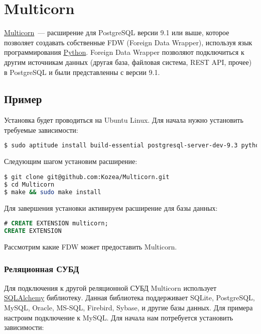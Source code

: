 \section{Multicorn}

\href{http://multicorn.org/}{Multicorn}~--- расширение для PostgreSQL версии 9.1 или выше, которое позволяет создавать собственные FDW (Foreign Data Wrapper), используя язык программирования \href{https://www.python.org/}{Python}. Foreign Data Wrapper позволяют подключиться к другим источникам данных (другая база, файловая система, REST API, прочее) в PostgreSQL и были представленны с версии 9.1.


\subsection{Пример}

Установка будет проводиться на Ubuntu Linux. Для начала нужно установить требуемые зависимости:

\begin{lstlisting}[language=Bash,label=lst:pgmulticorn1,caption=Multicorn]
$ sudo aptitude install build-essential postgresql-server-dev-9.3 python-dev python-setuptools
\end{lstlisting}

Следующим шагом установим расширение:

\begin{lstlisting}[language=Bash,label=lst:pgmulticorn2,caption=Multicorn]
$ git clone git@github.com:Kozea/Multicorn.git
$ cd Multicorn
$ make && sudo make install
\end{lstlisting}

Для завершения установки активируем расширение для базы данных:

\begin{lstlisting}[language=SQL,label=lst:pgmulticorn3,caption=Multicorn]
# CREATE EXTENSION multicorn;
CREATE EXTENSION
\end{lstlisting}

Рассмотрим какие FDW может предоставить Multicorn.


\subsubsection{Реляционная СУБД}

Для подключения к другой реляционной СУБД Multicorn использует \href{http://www.sqlalchemy.org/}{SQLAlchemy} библиотеку. Данная библиотека поддерживает SQLite, PostgreSQL, MySQL, Oracle, MS-SQL, Firebird, Sybase, и другие базы данных. Для примера настроим подключение к MySQL. Для начала нам потребуется установить зависимости:

